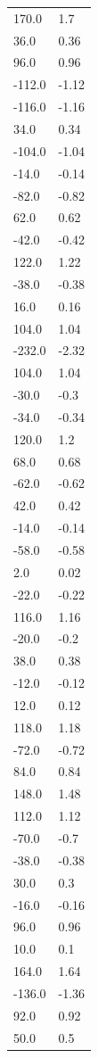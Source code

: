 \begin{longtable}{ll}
170.0 & 1.7 \\
36.0 & 0.36 \\
96.0 & 0.96 \\
-112.0 & -1.12 \\
-116.0 & -1.16 \\
34.0 & 0.34 \\
-104.0 & -1.04 \\
-14.0 & -0.14 \\
-82.0 & -0.82 \\
62.0 & 0.62 \\
-42.0 & -0.42 \\
122.0 & 1.22 \\
-38.0 & -0.38 \\
16.0 & 0.16 \\
104.0 & 1.04 \\
-232.0 & -2.32 \\
104.0 & 1.04 \\
-30.0 & -0.3 \\
-34.0 & -0.34 \\
120.0 & 1.2 \\
68.0 & 0.68 \\
-62.0 & -0.62 \\
42.0 & 0.42 \\
-14.0 & -0.14 \\
-58.0 & -0.58 \\
2.0 & 0.02 \\
-22.0 & -0.22 \\
116.0 & 1.16 \\
-20.0 & -0.2 \\
38.0 & 0.38 \\
-12.0 & -0.12 \\
12.0 & 0.12 \\
118.0 & 1.18 \\
-72.0 & -0.72 \\
84.0 & 0.84 \\
148.0 & 1.48 \\
112.0 & 1.12 \\
-70.0 & -0.7 \\
-38.0 & -0.38 \\
30.0 & 0.3 \\
-16.0 & -0.16 \\
96.0 & 0.96 \\
10.0 & 0.1 \\
164.0 & 1.64 \\
-136.0 & -1.36 \\
92.0 & 0.92 \\
50.0 & 0.5 \\

\end{longtable}
